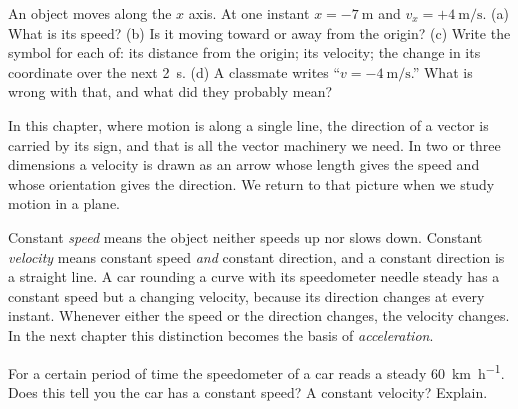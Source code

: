 \documentclass[11pt,twoside,openany]{book}
\newcounter{check}[chapter]
\begin{document}
\begin{checkbox}
An object moves along the $x$ axis. At one instant $x = \SI{-7}{\metre}$ and $v_x = +\SI{4}{\metre\per\second}$. (a) What is its speed? (b) Is it moving toward or away from the origin? (c) Write the symbol for each of: its distance from the origin; its velocity; the change in its coordinate over the next \SI{2}{\second}. (d) A classmate writes ``$v = \SI{-4}{\metre\per\second}$.'' What is wrong with that, and what did they probably mean?
\end{checkbox}

In this chapter, where motion is along a single line, the direction of a vector is carried by its sign, and that is all the vector machinery we need. In two or three dimensions a velocity is drawn as an arrow whose length gives the speed and whose orientation gives the direction. We return to that picture when we study motion in a plane.

\begin{keyidea}
Constant \emph{speed} means the object neither speeds up nor slows down. Constant \emph{velocity} means constant speed \emph{and} constant direction, and a constant direction is a straight line. A car rounding a curve with its speedometer needle steady has a constant speed but a changing velocity, because its direction changes at every instant. Whenever either the speed or the direction changes, the velocity changes. In the next chapter this distinction becomes the basis of \emph{acceleration}.
\end{keyidea}

\begin{checkbox}
For a certain period of time the speedometer of a car reads a steady \SI{60}{\kilo\metre\per\hour}. Does this tell you the car has a constant speed? A constant velocity? Explain.
\end{checkbox}
\end{document}
